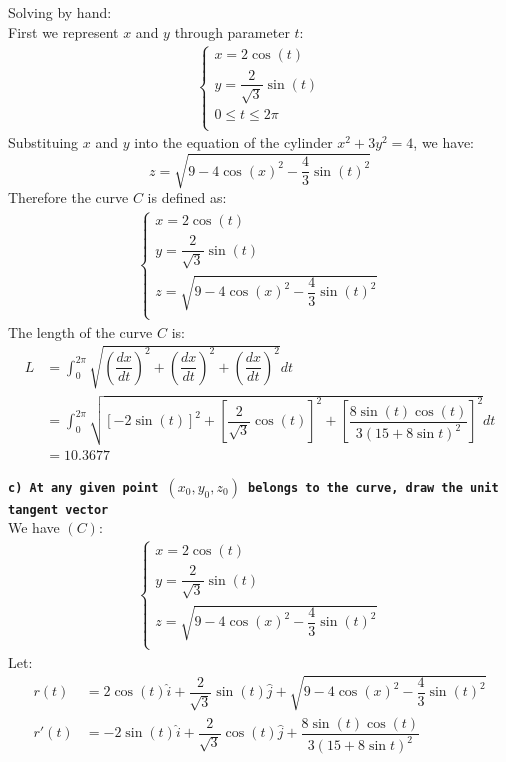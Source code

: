 Solving by hand:\\
First we represent $x$ and $y$ through parameter $t$:
\begin{align}
  \begin{cases}
    x = 2\cos(t) \\
    y = \dfrac{2}{\sqrt{3}}\sin(t) \\
    0 \leq t \leq 2\pi\\
  \end{cases}
\end{align}
Substituing $x$ and $y$ into the equation of the cylinder $x^2 + 3y^2 = 4$, we have:
$$ z = \sqrt{  9 - 4\cos(x)^2 - \dfrac{4}{3}\sin(t)^2  } $$
Therefore the curve $C$ is defined as:
\begin{align}
  \begin{cases}
    x = 2\cos(t) \\
    y = \dfrac{2}{\sqrt{3}}\sin(t) \\
    z = \sqrt{  9 - 4\cos(x)^2 - \dfrac{4}{3}\sin(t)^2  } \\
  \end{cases}
\end{align}
The length of the curve $C$ is:
\begin{align*}
  L &= \int_{0}^{2\pi}\sqrt{\left(\dfrac{dx}{dt}\right)^2 + \left(\dfrac{dx}{dt}\right)^2 + \left(\dfrac{dx}{dt}\right)^2} dt \\
    &= \int_{0}^{2\pi}\sqrt{[-2\sin(t)]^2 + \left[\dfrac{2}{\sqrt{3}}\cos(t) \right]^2 + \left[\dfrac{8\sin(t)\cos(t)}{ 3(15+8\sin t)^2 }\right]^2} dt \\
    &= 10.3677
\end{align*}

\textbf{ \texttt{c) At any given point $(x_0, y_0, z_0)$ belongs to the curve, draw the unit tangent vector} }\\[6pt]
We have $(C)$:
\begin{align}
  \begin{cases}
    x = 2\cos(t) \\
    y = \dfrac{2}{\sqrt{3}}\sin(t) \\
    z = \sqrt{  9 - 4\cos(x)^2 - \dfrac{4}{3}\sin(t)^2  } \\
  \end{cases}
\end{align}
Let:
\begin{align*}
  r(t)  &=  2\cos(t)\hat{i} + \dfrac{2}{\sqrt{3}}\sin(t)\hat{j} + \sqrt{  9 - 4\cos(x)^2 - \dfrac{4}{3}\sin(t)^2  }    \\
  r'(t) &=  -2\sin(t)\hat{i} + \dfrac{2}{\sqrt{3}}\cos(t)\hat{j} + \dfrac{8\sin(t)\cos(t)}{ 3(15+8\sin t)^2 }     \\
\end{align*}

